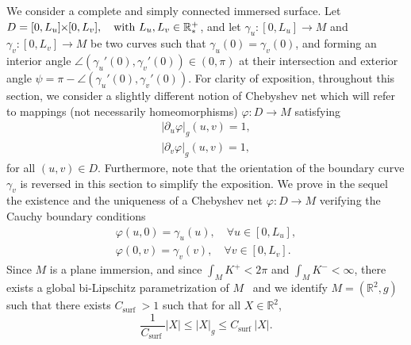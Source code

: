 \documentclass{article}
\newcommand{\Csurf}{C_{\text{surf }}}
\newcommand{\PLH}{{\mkern-1mu\times\mkern-1mu}}
\newcommand{\Times}{\PLH}
\newcommand{\R}{\mathbb{R}}
\newcommand{\surf}{M}
\theoremstyle{remark}
\theoremstyle{prpart}
\begin{document}
We consider a complete and simply connected immersed surface. Let 
$ D=[0,L_u]\Times[0,L_v],\quad\text{with } L_u,L_v\in\R_\ast^+$,
and let $\gamma_u:[0,L_u]\to\surf$ and $\gamma_v:[0,L_v]\to\surf$ be
 two curves such that $\gamma_u(0)=\gamma_v(0)$, and forming an
 interior angle $\angle(\gamma_u'(0),\gamma_v'(0))\in(0,\pi)$ at their
 intersection and exterior angle
 $\psi=\pi-\angle(\gamma_u'(0),\gamma_v'(0))$. For clarity of
 exposition, throughout this section, we consider a slightly different
 notion of Chebyshev net which will refer to mappings (not necessarily
 homeomorphisms) $\varphi:D\to\surf$ satisfying
\begin{subequations}\label{eq:cheb-def-c3}
\begin{align}\label{eq:cheb-def-c3a}
|\partial_u \varphi|_g(u,v) = 1,\\
|\partial_v \varphi|_g(u,v) = 1,\label{eq:cheb-def-c3b}
\end{align}
\end{subequations}
for all $(u,v)\in D$. Furthermore, note that the orientation of the boundary curve $\gamma_v$ is reversed in this section to simplify the exposition. 
We prove in the sequel the existence and the uniqueness of a Chebyshev net $\varphi:D\to\surf$ verifying the Cauchy boundary conditions
\begin{equation}\label{eq:cond-bord-c3}
\begin{split}
  \varphi(u,0)=\gamma_u(u),\quad\forall u\in[0,L_u],\\ 
  \varphi(0,v)=\gamma_v(v),\quad\forall v\in[0,L_v].
\end{split}
\end{equation}
Since $\surf$ is a plane immersion, and since $\int_\surf{K^+}<2\pi$
and $\int_\surf{K^-}<\infty$, there exists a global bi-Lipschitz
parametrization of $\surf$~\cite{Bonk03} and we identify
$\surf=(\R^2,g)$ such that there exists $\Csurf>1$ such that for all $X\in\R^2$,
\begin{equation}\label{eq:equiv}
  \frac{1}{\Csurf}|X|\leq |X|_{g} \leq \Csurf|X|.
\end{equation}
\end{document}
